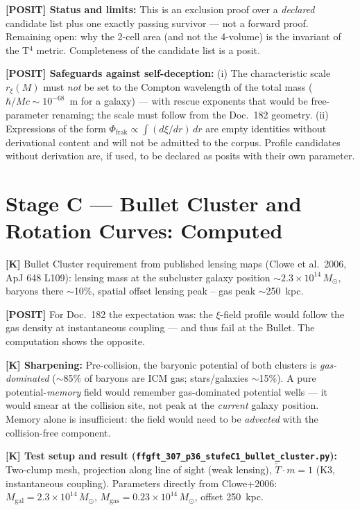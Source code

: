 \medskip
\textbf{[POSIT] Status and limits:} This is an exclusion proof over a
\emph{declared} candidate list plus one exactly passing survivor — not
a forward proof. Remaining open: why the 2-cell area (and not the
4-volume) is the invariant of the T$^4$ metric. Completeness of the
candidate list is a posit.

\medskip
\textbf{[POSIT] Safeguards against self-deception:}
(i) The characteristic scale $r_\xi(M)$ must \emph{not} be set to the
Compton wavelength of the total mass ($\hbar/Mc \sim 10^{-68}$~m for a
galaxy) — with rescue exponents that would be free-parameter renaming;
the scale must follow from the Doc.~182 geometry. (ii) Expressions of
the form $\Phi_\text{frak} \propto \int (d\xi/dr)\,dr$ are empty
identities without derivational content and will not be admitted to the
corpus. Profile candidates without derivation are, if used, to be
declared as posits with their own parameter.

\section{Stage C — Bullet Cluster and Rotation Curves: Computed}

\textbf{[K]} Bullet Cluster requirement from published lensing maps
(Clowe et al.\ 2006, ApJ 648 L109): lensing mass at the subcluster
galaxy position $\sim 2.3\times 10^{14}\,M_\odot$, baryons there
$\sim$10\%, spatial offset lensing peak -- gas peak $\sim$250~kpc.

\medskip
\textbf{[POSIT]} For Doc.~182 the expectation was: the $\xi$-field
profile would follow the gas density at instantaneous coupling —
and thus fail at the Bullet. The computation shows the opposite.

\medskip
\textbf{[K] Sharpening:} Pre-collision, the baryonic potential of both
clusters is \emph{gas-dominated} ($\sim$85\% of baryons are ICM gas;
stars/galaxies $\sim$15\%). A pure potential-\emph{memory} field would
remember gas-dominated potential wells — it would smear at the collision
site, not peak at the \emph{current} galaxy position. Memory alone is
insufficient: the field would need to be \emph{advected} with the
collision-free component.

\medskip
\textbf{[K] Test setup and result
(\texttt{ffgft\_307\_p36\_stufeC1\_bullet\_cluster.py}):}
Two-clump mesh, projection along line of sight (weak lensing),
$\tilde T \cdot m = 1$ (K3, instantaneous coupling). Parameters
directly from Clowe+2006: $M_\text{gal} = 2.3\times10^{14}\,M_\odot$,
$M_\text{gas} = 0.23\times10^{14}\,M_\odot$, offset 250~kpc.

